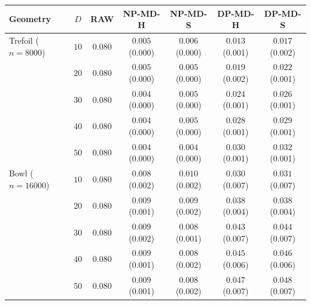 \begin{tabular}{lcccccc}
\toprule
Geometry & $D$ & RAW & NP-MD-H & NP-MD-S & DP-MD-H & DP-MD-S \\
\midrule
Trefoil ($n=8000$) & $10$ & $0.080$ & $0.005$ \scriptsize(0.000) & $0.006$ \scriptsize(0.000) & $0.013$ \scriptsize(0.001) & $0.017$ \scriptsize(0.002) \\
 & $20$ & $0.080$ & $0.005$ \scriptsize(0.000) & $0.005$ \scriptsize(0.000) & $0.019$ \scriptsize(0.002) & $0.022$ \scriptsize(0.001) \\
 & $30$ & $0.080$ & $0.004$ \scriptsize(0.000) & $0.005$ \scriptsize(0.000) & $0.024$ \scriptsize(0.001) & $0.026$ \scriptsize(0.001) \\
 & $40$ & $0.080$ & $0.004$ \scriptsize(0.000) & $0.005$ \scriptsize(0.000) & $0.028$ \scriptsize(0.001) & $0.029$ \scriptsize(0.001) \\
 & $50$ & $0.080$ & $0.004$ \scriptsize(0.000) & $0.004$ \scriptsize(0.000) & $0.030$ \scriptsize(0.001) & $0.032$ \scriptsize(0.001) \\
\midrule
Bowl ($n=16000$) & $10$ & $0.080$ & $0.008$ \scriptsize(0.002) & $0.010$ \scriptsize(0.002) & $0.030$ \scriptsize(0.007) & $0.031$ \scriptsize(0.007) \\
 & $20$ & $0.080$ & $0.009$ \scriptsize(0.001) & $0.009$ \scriptsize(0.002) & $0.038$ \scriptsize(0.004) & $0.038$ \scriptsize(0.004) \\
 & $30$ & $0.080$ & $0.009$ \scriptsize(0.002) & $0.008$ \scriptsize(0.001) & $0.043$ \scriptsize(0.007) & $0.044$ \scriptsize(0.007) \\
 & $40$ & $0.080$ & $0.009$ \scriptsize(0.001) & $0.008$ \scriptsize(0.002) & $0.045$ \scriptsize(0.006) & $0.046$ \scriptsize(0.006) \\
 & $50$ & $0.080$ & $0.009$ \scriptsize(0.001) & $0.008$ \scriptsize(0.002) & $0.047$ \scriptsize(0.007) & $0.048$ \scriptsize(0.007) \\
\bottomrule
\end{tabular}
